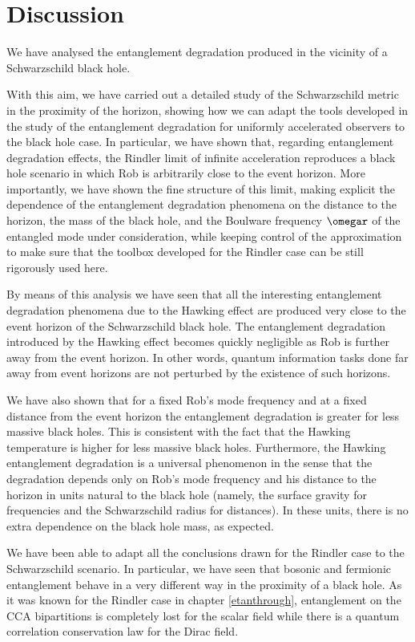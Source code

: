 \section{Discussion}\label{conclusions}


We have analysed the entanglement degradation produced in the vicinity
of a Schwarzschild black hole.

With this aim, we have carried out a detailed study of the Schwarzschild
metric in the proximity of the horizon, showing how we can adapt the
tools developed in the study of the entanglement degradation for
uniformly accelerated observers
to the black hole case. In particular, we have shown that, regarding
entanglement degradation effects, the Rindler limit of infinite acceleration reproduces
a black hole scenario in which Rob is arbitrarily close to the event horizon.
More importantly, we have shown the fine structure of this  limit, making
explicit the dependence of the entanglement degradation phenomena on the distance
to the horizon, the mass of the black hole, and the Boulware frequency
$\omegar$ of the entangled mode under consideration, while keeping
control of the approximation to make sure that the toolbox developed for
the Rindler case can be still rigorously used here.

By means of this analysis we have seen that all the interesting
 entanglement degradation phenomena due to the Hawking effect are produced very
close to the event horizon of the Schwarzschild black hole. The
entanglement degradation introduced by the Hawking effect becomes
quickly negligible as Rob is further away from the event horizon. In  other
words, quantum information tasks done far away from event horizons are
not perturbed by the existence of such horizons.



We have also shown that for a fixed Rob's mode frequency and at a fixed
distance from the event horizon the entanglement degradation is greater
for less massive black holes. This is consistent with the fact that the
Hawking temperature is higher for less massive black holes. Furthermore,
  the Hawking entanglement degradation is a universal
phenomenon in the sense that the degradation depends only on Rob's mode 
frequency and his distance to   the horizon in units natural to the black
hole (namely, the surface gravity for frequencies and the Schwarzschild
radius for distances). In these units, there is no extra dependence on the
black hole mass,  as expected.


We have been able to adapt all the conclusions drawn for the Rindler case
to the Schwarzschild scenario. In particular, we have seen that bosonic
and fermionic entanglement behave in a very different way in the
proximity of a black hole. As it was known for the Rindler case
in chapter \ref{etanthrough}, entanglement on the CCA bipartitions is completely lost for
the scalar field while there is a quantum correlation  conservation law for
the Dirac field.

